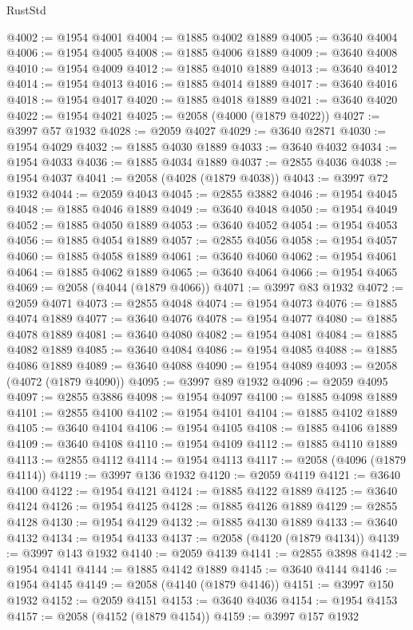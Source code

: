 \begin{lexlean}{RustStd}
\begin{coremodule}
@4002 := @1954 @4001
@4004 := @1885 @4002 @1889
@4005 := @3640 @4004
@4006 := @1954 @4005
@4008 := @1885 @4006 @1889
@4009 := @3640 @4008
@4010 := @1954 @4009
@4012 := @1885 @4010 @1889
@4013 := @3640 @4012
@4014 := @1954 @4013
@4016 := @1885 @4014 @1889
@4017 := @3640 @4016
@4018 := @1954 @4017
@4020 := @1885 @4018 @1889
@4021 := @3640 @4020
@4022 := @1954 @4021
@4025 := @2058 (@4000 (@1879 @4022))
@4027 := @3997 @57 @1932
@4028 := @2059 @4027
@4029 := @3640 @2871
@4030 := @1954 @4029
@4032 := @1885 @4030 @1889
@4033 := @3640 @4032
@4034 := @1954 @4033
@4036 := @1885 @4034 @1889
@4037 := @2855 @4036
@4038 := @1954 @4037
@4041 := @2058 (@4028 (@1879 @4038))
@4043 := @3997 @72 @1932
@4044 := @2059 @4043
@4045 := @2855 @3882
@4046 := @1954 @4045
@4048 := @1885 @4046 @1889
@4049 := @3640 @4048
@4050 := @1954 @4049
@4052 := @1885 @4050 @1889
@4053 := @3640 @4052
@4054 := @1954 @4053
@4056 := @1885 @4054 @1889
@4057 := @2855 @4056
@4058 := @1954 @4057
@4060 := @1885 @4058 @1889
@4061 := @3640 @4060
@4062 := @1954 @4061
@4064 := @1885 @4062 @1889
@4065 := @3640 @4064
@4066 := @1954 @4065
@4069 := @2058 (@4044 (@1879 @4066))
@4071 := @3997 @83 @1932
@4072 := @2059 @4071
@4073 := @2855 @4048
@4074 := @1954 @4073
@4076 := @1885 @4074 @1889
@4077 := @3640 @4076
@4078 := @1954 @4077
@4080 := @1885 @4078 @1889
@4081 := @3640 @4080
@4082 := @1954 @4081
@4084 := @1885 @4082 @1889
@4085 := @3640 @4084
@4086 := @1954 @4085
@4088 := @1885 @4086 @1889
@4089 := @3640 @4088
@4090 := @1954 @4089
@4093 := @2058 (@4072 (@1879 @4090))
@4095 := @3997 @89 @1932
@4096 := @2059 @4095
@4097 := @2855 @3886
@4098 := @1954 @4097
@4100 := @1885 @4098 @1889
@4101 := @2855 @4100
@4102 := @1954 @4101
@4104 := @1885 @4102 @1889
@4105 := @3640 @4104
@4106 := @1954 @4105
@4108 := @1885 @4106 @1889
@4109 := @3640 @4108
@4110 := @1954 @4109
@4112 := @1885 @4110 @1889
@4113 := @2855 @4112
@4114 := @1954 @4113
@4117 := @2058 (@4096 (@1879 @4114))
@4119 := @3997 @136 @1932
@4120 := @2059 @4119
@4121 := @3640 @4100
@4122 := @1954 @4121
@4124 := @1885 @4122 @1889
@4125 := @3640 @4124
@4126 := @1954 @4125
@4128 := @1885 @4126 @1889
@4129 := @2855 @4128
@4130 := @1954 @4129
@4132 := @1885 @4130 @1889
@4133 := @3640 @4132
@4134 := @1954 @4133
@4137 := @2058 (@4120 (@1879 @4134))
@4139 := @3997 @143 @1932
@4140 := @2059 @4139
@4141 := @2855 @3898
@4142 := @1954 @4141
@4144 := @1885 @4142 @1889
@4145 := @3640 @4144
@4146 := @1954 @4145
@4149 := @2058 (@4140 (@1879 @4146))
@4151 := @3997 @150 @1932
@4152 := @2059 @4151
@4153 := @3640 @4036
@4154 := @1954 @4153
@4157 := @2058 (@4152 (@1879 @4154))
@4159 := @3997 @157 @1932

\end{coremodule}
\end{lexlean}
